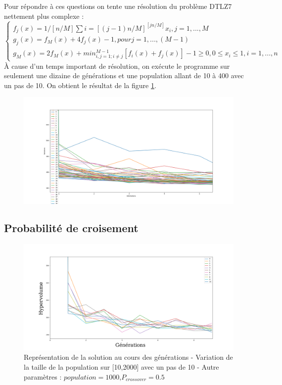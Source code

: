 \documentclass[12pt]{report}
\begin{document}
      Pour répondre à ces questions on tente une résolution du problème DTLZ7 nettement plus complexe :
      $$
      \left\{
        \begin{array}{ll}
           f_j(x) = 1/[n/M] \sum{i=[(j-1)n/M]}^[jn/M] x_i , j=1,...,M  \\
           g_j(x) = f_M(x) + 4f_j(x) - 1 , pour j = 1,...,(M-1) \\
           g_M(x) = 2f_M(x) + min_{i,j = 1 ; i \neq j}^{M-1}[f_i(x)+f_j(x)] - 1 \ge 0 , 0 \le x_i \le 1, i = 1,...,n
        \end{array}
      \right.
      $$
      À cause d'un temps important de résolution, on exécute le programme sur seulement une dizaine de générations et une population allant de 10 à 400 avec un pas de 10.
      On obtient le résultat de la figure \ref{DTLZ7_pop}.
      \begin{figure}[h]
        \centering
        \includegraphics[width=15cm]{img/DTLZ7_pop.png}
        \caption{}
        \label{DTLZ7_pop}
      \end{figure}

      \subsection{Probabilité de croisement}
      \begin{figure}[h]
        \centering
        \includegraphics[width=15cm]{img/DTLZ7_crossover.png}
        \caption{Représentation de la solution au cours des générations - Variation de la taille de la population sur [10,2000] avec un pas de 10 - Autre paramètres : $population = 1000$,$P_{crossover} = 0.5$}
        \label{sch_crossover_moy}
      \end{figure}
\end{document}
